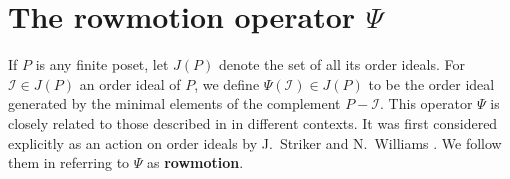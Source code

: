\documentclass[12pt]{amsart}
\theoremstyle{definition}
\theoremstyle{remark}
\numberwithin{equation}{section}
\newcommand{\uu}{\mathcal{I}}
\begin{document}
\section{The rowmotion operator $\Psi$}\label{sec:rowmotion}

If $P$ is any finite poset, let $J(P)$ denote the set of all its order ideals. For $\uu \in J(P)$ an order ideal of $P$, we define $\Psi(\uu) \in J(P)$ to be the order ideal generated by the minimal elements of the complement $P - \uu$. This operator $\Psi$ is closely related to those described in \cite{Brouwer.Schrijver,Duchet,Cameron.Fonderflaass} in different contexts. It was first considered explicitly as an action on order ideals by J.~Striker and N.~Williams \cite{Striker.Williams}. We follow them in referring to $\Psi$ as {\bf rowmotion}.

\end{document}
